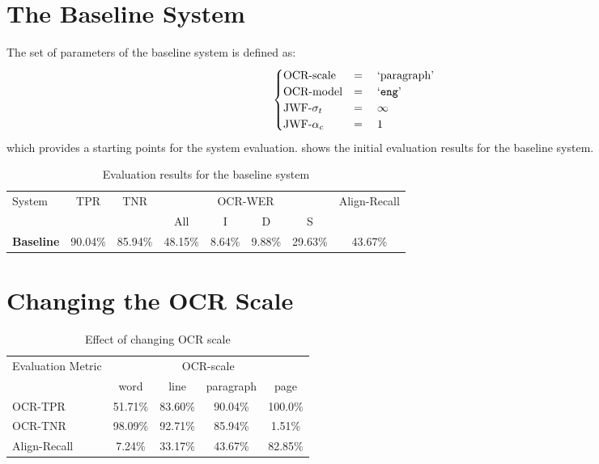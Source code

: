 \section{The Baseline System}

The set of parameters of the baseline system is defined as:
\begin{equation*}
    \begin{cases}
        \text{OCR-scale} &=\quad \text{`paragraph'} \\
        \text{OCR-model} &=\quad \text{`\texttt{eng}'} \\
        \text{JWF-}\sigma_t &=\quad \infty \\
        \text{JWF-}\alpha_c &=\quad 1
    \end{cases}
\end{equation*}
which provides a starting points for the system evaluation.  shows the initial evaluation results for the baseline system.

\begin{table}[!tb]
    \caption{Evaluation results for the baseline system}
    \centering
    \label{tab:eval-res-baseline}
    \begin{tabular}{l c c c c c c c}
    \toprule
    \multirow{2}{*}{System} &
    \multirow{2}{*}{TPR}& \multirow{2}{*}{TNR} & \multicolumn{4}{c}{OCR-WER} & \multirow{2}{*}{Align-Recall} \\
    \cmidrule{4-7}
    & & & All & I & D & S & \\
    \midrule
    \textbf{Baseline} &
    90.04\% & 85.94\% & 48.15\% & 8.64\% &9.88\% &29.63\% &43.67\% \\
    \bottomrule
    \end{tabular}
\end{table}

\section{Changing the OCR Scale}

\begin{table}[!b]
    \caption{Effect of changing OCR scale}
    \centering
    \label{tab:eval-res-scale}
    \begin{tabular}{l c c c c}
    \toprule
    \multirow{2}{*}{Evaluation Metric}& \multicolumn{4}{c}{OCR-scale}\\
    \cmidrule{2-5}
    & word & line & paragraph & page \\
    \midrule
    OCR-TPR & 51.71\%&83.60\%&90.04\%&100.0\%\\
    OCR-TNR & 98.09\%&92.71\%&85.94\%&1.51\%\\
    Align-Recall&7.24\%&33.17\%&43.67\%&82.85\%\\
    \bottomrule
    \end{tabular}
\end{table}

